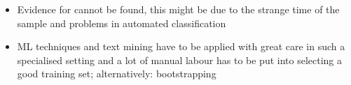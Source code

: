 
\begin{itemize}
	\item Evidence for \textcite{Ellingsen.2001} cannot be found, this might be due to the strange time of the sample and problems in automated classification
	\item ML techniques and text mining have to be applied with great care in such a specialised setting and a lot of manual labour has to be put into selecting a good training set; alternatively: bootstrapping 
\end{itemize}